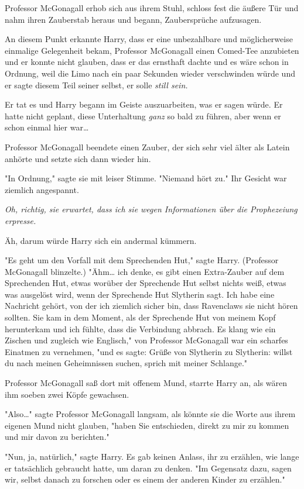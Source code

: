 {Professor McGonagall erhob sich aus ihrem Stuhl, schloss fest die äußere Tür und nahm ihren Zauberstab heraus und begann, Zaubersprüche aufzusagen.

An diesem Punkt erkannte Harry, dass er eine unbezahlbare und möglicherweise einmalige Gelegenheit bekam, Professor McGonagall einen Comed-Tee anzubieten und er konnte nicht glauben, dass er das ernsthaft dachte und es wäre schon in Ordnung, weil die Limo nach ein paar Sekunden wieder verschwinden würde und er sagte diesem Teil seiner selbst, er solle \emph{still sein.}

Er tat es und Harry begann im Geiste auszuarbeiten, was er sagen würde. Er hatte nicht geplant, diese Unterhaltung \emph{ganz} so bald zu führen, aber wenn er schon einmal hier war…

Professor McGonagall beendete einen Zauber, der sich sehr viel älter als Latein anhörte und setzte sich dann wieder hin.

"In Ordnung," sagte sie mit leiser Stimme. "Niemand hört zu." Ihr Gesicht war ziemlich angespannt.

\emph{Oh, richtig, sie erwartet, dass ich sie wegen Informationen über die Prophezeiung erpresse.}

Äh, darum würde Harry sich ein andermal kümmern.

"Es geht um den Vorfall mit dem Sprechenden Hut," sagte Harry. (Professor McGonagall blinzelte.) "Ähm… ich denke, es gibt einen Extra-Zauber auf dem Sprechenden Hut, etwas worüber der Sprechende Hut selbst nichts weiß, etwas was ausgelöst wird, wenn der Sprechende Hut Slytherin sagt. Ich habe eine Nachricht gehört, von der ich ziemlich sicher bin, dass Ravenclaws sie nicht hören sollten. Sie kam in dem Moment, als der Sprechende Hut von meinem Kopf herunterkam und ich fühlte, dass die Verbindung abbrach. Es klang wie ein Zischen und zugleich wie Englisch," von Professor McGonagall war ein scharfes Einatmen zu vernehmen, "und es sagte: Grüße von Slytherin zu Slytherin: willst du nach meinen Geheimnissen suchen, sprich mit meiner Schlange."

Professor McGonagall saß dort mit offenem Mund, starrte Harry an, als wären ihm soeben zwei Köpfe gewachsen.

"Also…" sagte Professor McGonagall langsam, als könnte sie die Worte aus ihrem eigenen Mund nicht glauben, "haben Sie entschieden, direkt zu mir zu kommen und mir davon zu berichten."

"Nun, ja, natürlich," sagte Harry. Es gab keinen Anlass, ihr zu erzählen, wie lange er tatsächlich gebraucht hatte, um daran zu denken. "Im Gegensatz dazu, sagen wir, selbst danach zu forschen oder es einem der anderen Kinder zu erzählen."

}
